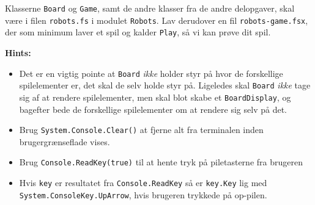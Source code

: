 Klasserne \lstinline{Board} og \lstinline{Game}, samt de andre klasser
fra de andre delopgaver, skal være i filen \texttt{robots.fs} i
modulet \lstinline{Robots}. Lav derudover en fil
\texttt{robots-game.fsx}, der som minimum laver et spil og kalder
\lstinline{Play}, så vi kan prøve dit spil.


\textbf{Hints:}
\begin{itemize}
\item Det er en vigtig pointe at \lstinline{Board} \emph{ikke} holder
  styr på hvor de forskellige spilelementer er, det skal de selv holde
  styr på. Ligeledes skal \lstinline{Board} \emph{ikke} tage sig af
  at rendere spilelementer, men skal blot skabe et
  \lstinline{BoardDisplay}, og bagefter bede de forskellige
  spilelementer om at rendere sig selv på det.
\item Brug \lstinline{System.Console.Clear()} at fjerne alt fra
  terminalen inden brugergrænseflade vises.
\item Brug \lstinline{Console.ReadKey(true)} til at hente tryk på
  piletasterne fra brugeren
\item Hvis \lstinline{key} er resultatet fra
  \lstinline{Console.ReadKey} så er \lstinline{key.Key} lig med\\
  \lstinline{System.ConsoleKey.UpArrow}, hvis brugeren trykkede på
  op-pilen.
\end{itemize}





